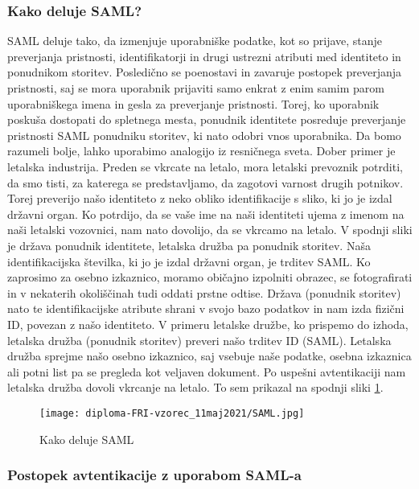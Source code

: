 \documentclass[a4paper,12pt,openright]{book}
\begin{document}
\subsubsection{Kako deluje SAML?}
SAML deluje tako, da izmenjuje uporabniške podatke, kot so prijave, stanje preverjanja pristnosti, identifikatorji in drugi ustrezni atributi med identiteto in ponudnikom storitev. Posledično se poenostavi in zavaruje postopek preverjanja pristnosti, saj se mora uporabnik prijaviti samo enkrat z enim samim parom uporabniškega imena in gesla za preverjanje pristnosti. Torej, ko uporabnik poskuša dostopati do spletnega mesta, ponudnik identitete posreduje preverjanje pristnosti SAML ponudniku storitev, ki nato odobri vnos uporabnika. Da bomo razumeli bolje, lahko uporabimo analogijo iz resničnega sveta.
\newline
Dober primer je letalska industrija. Preden se vkrcate na letalo, mora letalski prevoznik potrditi, da smo tisti, za katerega se predstavljamo, da zagotovi varnost drugih potnikov. Torej preverijo našo identiteto z neko obliko identifikacije s sliko, ki jo je izdal državni organ. Ko potrdijo, da se vaše ime na naši identiteti ujema z imenom na naši letalski vozovnici, nam nato dovolijo, da se vkrcamo na letalo.
\newline
V spodnji sliki je država ponudnik identitete, letalska družba pa ponudnik storitev. Naša identifikacijska številka, ki jo je izdal državni organ, je trditev SAML. Ko zaprosimo za osebno izkaznico, moramo običajno izpolniti obrazec, se fotografirati in v nekaterih okoliščinah tudi oddati prstne odtise. Država (ponudnik storitev) nato te identifikacijske atribute shrani v svojo bazo podatkov in nam izda fizični ID, povezan z našo identiteto. V primeru letalske družbe, ko prispemo do izhoda, letalska družba (ponudnik storitev) preveri našo trditev ID (SAML). Letalska družba sprejme našo osebno izkaznico, saj vsebuje naše podatke, osebna izkaznica ali potni list pa se pregleda kot veljaven dokument. Po uspešni avtentikaciji nam letalska družba dovoli vkrcanje na letalo. To sem prikazal na spodnji sliki \ref{fig:grafMoj}.

\begin{figure}[H]
\hspace{-2cm}
\texttt{[image: diploma-FRI-vzorec\_11maj2021/SAML.jpg]}
\caption{Kako deluje SAML}
\label{fig:grafMoj}
\end{figure}

\subsubsection{Postopek avtentikacije z uporabom SAML-a}
\end{document}
